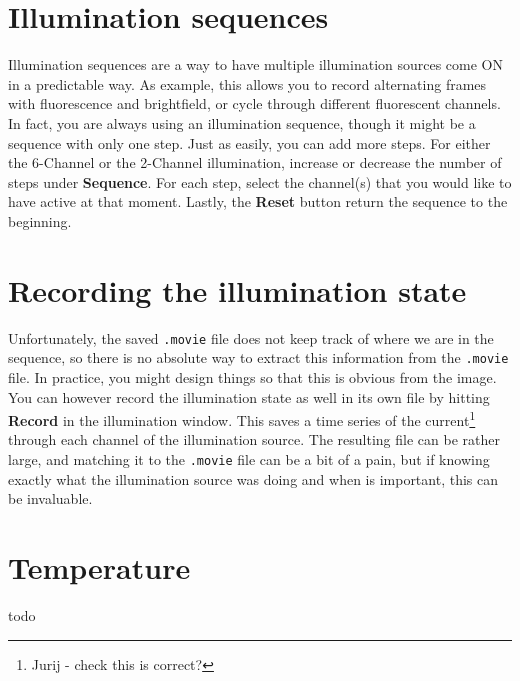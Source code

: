 \documentclass{report}
\begin{document}
\newpage

\section{Illumination sequences}

Illumination sequences are a way to have multiple illumination sources come ON  in a predictable way. As example, this allows you to record alternating frames with fluorescence and brightfield, or cycle through different fluorescent channels.\\

In fact, you are always using an illumination sequence, though it might be a sequence with only one step. Just as easily, you can add more steps. For either the 6-Channel or the 2-Channel illumination, increase or decrease the number of steps under \textbf{Sequence}. For each step, select the channel(s) that you would like to have active at that moment. Lastly, the \textbf{Reset} button return the sequence to the beginning.\\


\section{Recording the illumination state}



Unfortunately, the saved \verb|.movie| file does not keep track of where we are in the sequence, so there is  no absolute way to extract this information from the \verb|.movie| file. In practice, you might  design things so that this is obvious from the image.\\

You can however record the illumination state as well in its own file by hitting \textbf{Record} in the illumination window. This saves a time series of the current\footnote{Jurij - check this is correct?} through each channel of the illumination source. The resulting file can be rather large, and matching  it to the \verb|.movie| file can be a bit of a pain, but if knowing exactly what the illumination source was doing and when is important, this can be invaluable.




\newpage

\section{Temperature}


todo
\end{document}
